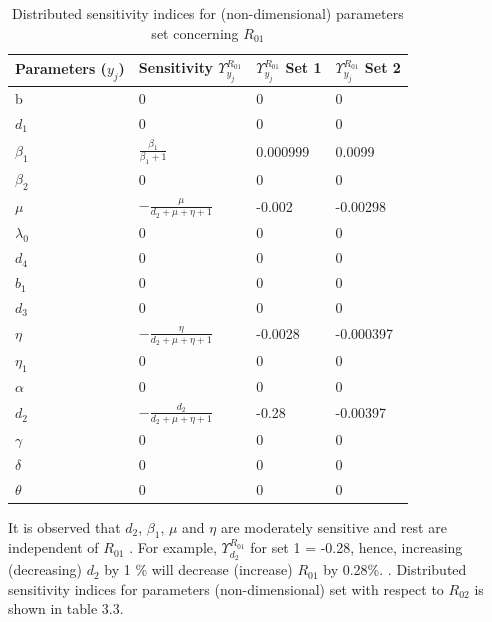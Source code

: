 \begin{table}[h]
\label{table:sens}
\begin{tabular}{|p{3 cm}|p{4 cm}|p{3 cm}|p{3 cm}|}
\hline
\bf Parameters ($y_j$) & \bf Sensitivity $ \Upsilon_{y_j}^{R_{01}} $&\bf $ \Upsilon_{y_j}^{R_{01}} $ Set 1&\bf $ \Upsilon_{y_j}^{R_{01}} $ Set 2 \\
\hline
b &0&0&0\\
$d_1$ &0&0&0\\
$\beta_1$ &$\frac{\beta_1}{\beta_1 +1}$&0.000999&0.0099\\
$\beta_2$ &0&0&0\\
$\mu$ &$-\frac{\mu}{d_2+\mu+\eta+1}$&-0.002&-0.00298\\
$\lambda_0$ &0&0&0\\
$d_4$ &0&0&0\\
$b_1$ &0&0&0\\
$d_3$ &0&0&0\\
$\eta$ &$-\frac{\eta}{d_2+\mu+\eta+1}$&-0.0028&-0.000397\\
$\eta_1$ &0&0&0\\
$\alpha$ &0&0&0\\
$d_2$ &$-\frac{d_2}{d_2+\mu+\eta+1}$&-0.28&-0.00397\\
$\gamma$ &0&0&0\\
$\delta$&0&0&0\\
$\theta$ &0&0&0\\
\hline
\end{tabular}
\caption {Distributed sensitivity indices for (non-dimensional) parameters set concerning $R_{01}$ }
\end{table}
\par
It is observed that $d_2$, $\beta_1$, $\mu$ and $\eta$ are moderately
sensitive and rest are independent of $R_{01}$ . For example, $ \Upsilon_{d_2}^{R_{01}} $
for set 1 = -0.28, hence, increasing (decreasing) $d_2$ by 1 \% will decrease (increase) $R_{01}$ by
0.28\%.
. Distributed sensitivity indices for parameters (non-dimensional) set with respect to $R_{02}$ is shown in table 3.3.
